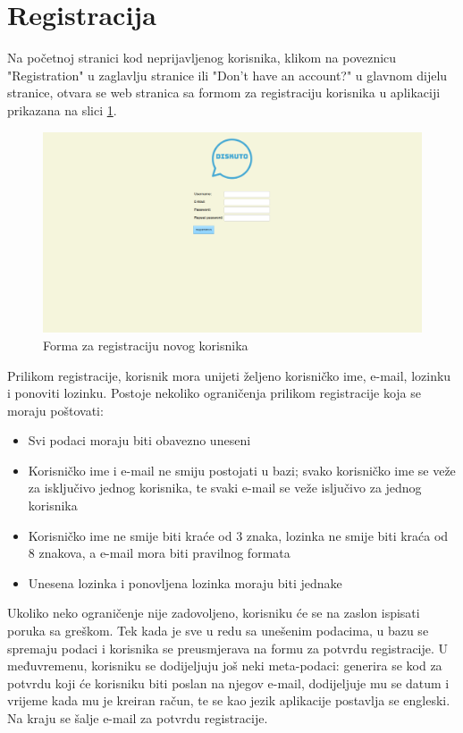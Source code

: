 \documentclass{foi}
\begin{document}
\section{Registracija}

Na početnoj stranici kod neprijavljenog korisnika, klikom na poveznicu "Registration" u zaglavlju stranice ili "Don't have an account?" u glavnom dijelu stranice, otvara se web stranica sa formom za registraciju korisnika u aplikaciji prikazana na slici \ref{registracija}.

\begin{figure}[h!]
    \centering
    \includegraphics[width=1\textwidth]{slike/registracija.png}
    \caption{Forma za registraciju novog korisnika}
    \label{registracija}
\end{figure}

Prilikom registracije, korisnik mora unijeti željeno korisničko ime, e-mail, lozinku i ponoviti lozinku. Postoje nekoliko ograničenja prilikom registracije koja se moraju poštovati:

\begin{itemize}
\item Svi podaci moraju biti obavezno uneseni
\item Korisničko ime i e-mail ne smiju postojati u bazi; svako korisničko ime se veže za isključivo jednog korisnika, te svaki e-mail se veže isljučivo za jednog korisnika
\item Korisničko ime ne smije biti kraće od 3 znaka, lozinka ne smije biti kraća od 8 znakova, a e-mail mora biti pravilnog formata
\item Unesena lozinka i ponovljena lozinka moraju biti jednake
\end{itemize}

Ukoliko neko ograničenje nije zadovoljeno, korisniku će se na zaslon ispisati poruka sa greškom. Tek kada je sve u redu sa unešenim podacima, u bazu se spremaju podaci i korisnika se preusmjerava na formu za potvrdu registracije. U međuvremenu, korisniku se dodijeljuju još neki meta-podaci: generira se kod za potvrdu koji će korisniku biti poslan na njegov e-mail, dodijeljuje mu se datum i vrijeme kada mu je kreiran račun, te se kao jezik aplikacije postavlja se engleski. Na kraju se šalje e-mail za potvrdu registracije.
\end{document}
